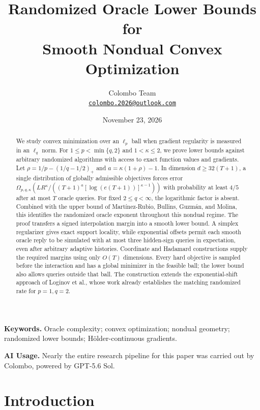 \documentclass[11pt,a4paper]{article}
\title{Randomized Oracle Lower Bounds for\\Smooth Nondual Convex Optimization}
\author{Colombo Team\\[3pt]
  \small\href{mailto:colombo.2026@outlook.com}{\texttt{colombo.2026@outlook.com}}}
\date{November 23, 2026}
\theoremstyle{definition}
\theoremstyle{remark}
\begin{document}
\maketitle

\begin{abstract}
We study convex minimization over an $\ell_p$ ball when gradient regularity is
measured in an $\ell_q$ norm. For $1\le p<\min\{q,2\}$ and
$1<\kappa\le2$, we prove lower bounds against arbitrary randomized algorithms
with access to exact function values and gradients. Let
$\rho=1/p-(1/q-1/2)_+$ and $a=\kappa(1+\rho)-1$.
In dimension $d\ge32(T+1)$, a single distribution of globally admissible
objectives forces error
$\Omega_{p,q,\kappa}(LR^\kappa/((T+1)^a[\log(e(T+1))]^{\kappa-1}))$
with probability at least $4/5$ after at most $T$ oracle queries.
For fixed $2\le q<\infty$, the logarithmic factor is absent.
Combined with the upper bound of Mart\'inez-Rubio, Bullins, Guzm\'an, and
Molina, this identifies the randomized oracle exponent throughout this
nondual regime. The proof transfers a signed interpolation margin into a
smooth lower bound. A simplex regularizer gives exact support locality,
while exponential offsets permit each smooth oracle reply to be simulated
with at most three hidden-sign queries in expectation, even after arbitrary
adaptive histories. Coordinate and Hadamard constructions supply the
required margins using only $O(T)$ dimensions. Every hard objective is sampled
before the interaction and has a global minimizer in the feasible ball;
the lower bound also allows queries outside that ball. The construction
extends the exponential-shift approach of Loginov et al., whose work already
establishes the matching randomized rate for $p=1,q=2$.
\end{abstract}

\noindent\textbf{Keywords.}
Oracle complexity; convex optimization; nondual geometry; randomized lower
bounds; H\"older-continuous gradients.

\medskip
\begin{samepage}
\noindent\textbf{AI Usage.}
Nearly the entire research pipeline for this paper was carried out by
Colombo, powered by GPT-5.6 Sol.
\par
\end{samepage}

\section{Introduction}\label{sec:intro}
\end{document}
